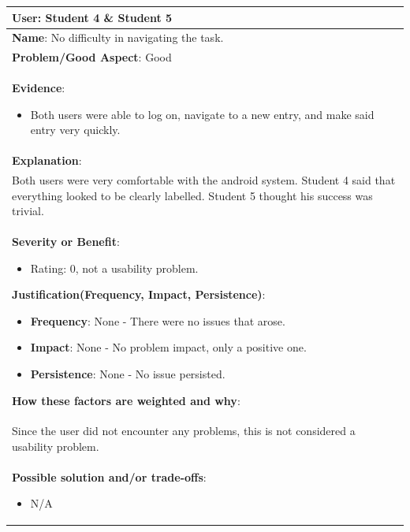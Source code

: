 \documentclass[pdftex,12pt,a4paper]{report}
\begin{document}
\begin{center}
	\begin{longtable}{|p{\textwidth}|}
	\hline
	\textbf{User}: Student 4 \& Student 5\\
	\hline
	\textbf{Name}: No difficulty in navigating the task.\\
	\hline
	\textbf{Problem/Good Aspect}: Good\\
	\hline
	\textbf{Evidence}:
	\begin{itemize}
	\item{Both users were able to log on, navigate to a new entry, and make said entry very quickly.}
	\end{itemize}\\
	\hline
	\textbf{Explanation}:\\
	Both users were very comfortable with the android system. Student 4 said that everything looked to be clearly labelled. Student 5 thought his success was trivial.\\
	\hline
\textbf{Severity or Benefit}:
	\begin{itemize}
	\item{Rating: 0, not a usability problem.}
	\end{itemize}
	\textbf{Justification(Frequency, Impact, Persistence)}:
	\begin{itemize}
	\item{\textbf{Frequency}:} None - There were no issues that arose.
	\item{\textbf{Impact}:} None - No problem impact, only a positive one.
	\item{\textbf{Persistence}:} None - No issue persisted.
	\end{itemize}
	\textbf{How these factors are weighted and why}:\\
	Since the user did not encounter any problems, this is not considered a usability problem.\\
	\hline
	\textbf{Possible solution and/or trade-offs}:
	\begin{itemize}
	\item{N/A}
	\end{itemize}\\
	\hline
	\end{longtable}
\end{center}
\end{document}
